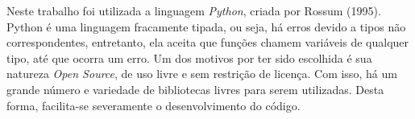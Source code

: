 Neste trabalho foi utilizada a linguagem \textit{Python}, criada por Rossum (1995)\cite{python}.
Python é uma linguagem fracamente tipada, ou seja, há erros devido a tipos não correspondentes, entretanto, ela aceita que funções chamem variáveis de qualquer tipo, até que ocorra um erro.
Um dos motivos por ter sido escolhida é sua natureza \textit{Open Source}, de uso livre e sem restrição de licença.
Com isso, há um grande número e variedade de bibliotecas livres para serem utilizadas.
Desta forma, facilita-se severamente o desenvolvimento do código.
